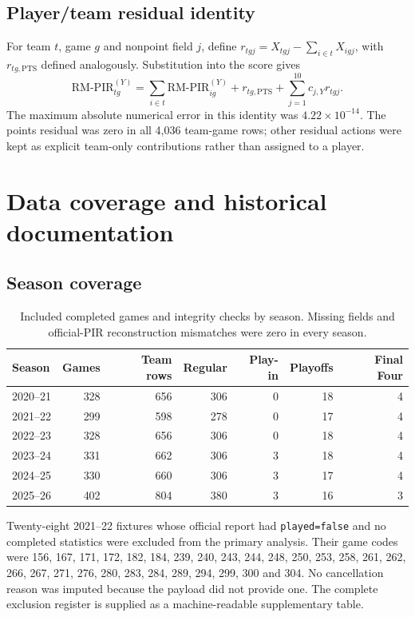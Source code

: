 \documentclass[pdflatex,sn-mathphys-num]{sn-jnl}
\newcommand{\rmpir}{\mathrm{RM\text{-}PIR}}
\begin{document}
\subsection{Player/team residual identity}

For team \(t\), game \(g\) and nonpoint field \(j\), define \(r_{tgj}=X_{tgj}-\sum_{i\in t}X_{igj}\), with \(r_{tg,\mathrm{PTS}}\) defined analogously. Substitution into the score gives
\begin{equation}
\rmpir_{tg}^{(Y)}=\sum_{i\in t}\rmpir_{ig}^{(Y)}
+r_{tg,\mathrm{PTS}}+\sum_{j=1}^{10}c_{j,Y}r_{tgj}.
\label{eq:s-additivity}
\end{equation}
The maximum absolute numerical error in this identity was \(4.22\times10^{-14}\). The points residual was zero in all 4,036 team-game rows; other residual actions were kept as explicit team-only contributions rather than assigned to a player.

\section{Data coverage and historical documentation}

\subsection{Season coverage}

\begin{table}[t]
\caption{Included completed games and integrity checks by season. Missing fields and official-PIR reconstruction mismatches were zero in every season.}
\label{tab:s-coverage}
\centering
\small
\begin{tabular}{@{}lrrrrrr@{}}
\toprule
Season & Games & Team rows & Regular & Play-in & Playoffs & Final Four \\
\midrule
2020--21 & 328 & 656 & 306 & 0 & 18 & 4 \\
2021--22 & 299 & 598 & 278 & 0 & 17 & 4 \\
2022--23 & 328 & 656 & 306 & 0 & 18 & 4 \\
2023--24 & 331 & 662 & 306 & 3 & 18 & 4 \\
2024--25 & 330 & 660 & 306 & 3 & 17 & 4 \\
2025--26 & 402 & 804 & 380 & 3 & 16 & 3 \\
\bottomrule
\end{tabular}
\end{table}

Twenty-eight 2021--22 fixtures whose official report had \texttt{played=false} and no completed statistics were excluded from the primary analysis. Their game codes were 156, 167, 171, 172, 182, 184, 239, 240, 243, 244, 248, 250, 253, 258, 261, 262, 266, 267, 271, 276, 280, 283, 284, 289, 294, 299, 300 and 304. No cancellation reason was imputed because the payload did not provide one. The complete exclusion register is supplied as a machine-readable supplementary table.
\end{document}
